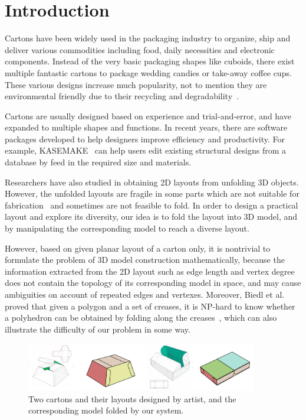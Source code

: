 \section{Introduction}

Cartons have been widely used in the packaging industry to organize, ship and deliver various commodities including food, daily necessities and electronic components. Instead of the very basic packaging shapes like cuboids, there exist multiple fantastic cartons to package wedding candies or take-away coffee cups. 
These various designs increase much popularity, not to mention they are environmental friendly due to their recycling and degradability~\cite{Mullineux:2010:CSC:1739328.1739673}.

Cartons are usually designed based on experience and trial-and-error, and have expanded to multiple shapes and functions. In recent years, there are software packages developed to help designers improve efficiency and productivity.
For example, KASEMAKE~\cite{KASEMAKE} can help users edit existing structural designs from a database by feed in the required size and materials.

Researchers have also studied in obtaining 2D layouts from unfolding 3D objects. However, the unfolded layouts are fragile in some parts which are not suitable for fabrication~\cite{Tai2004Unfolding} and sometimes are not feasible to fold.
In order to design a practical layout and explore its diversity, our idea is to fold the layout into 3D model, and by manipulating the corresponding model to reach a diverse layout.

However, based on given planar layout of a carton only, it is nontrivial to formulate the problem of 3D model construction mathematically, because the information extracted from the 2D layout such as edge length and vertex degree does not contain the topology of its corresponding model in space, and may cause ambiguities on account of repeated edges and vertexes. Moreover, Biedl et al. proved that given a polygon and a set of creases, it is NP-hard to know whether a polyhedron can be obtained by folding along the creases~\cite{Biedl:2005:NFP:1090462.1646553}, which can also illustrate the difficulty of our problem in some way.

\begin{figure}
	\centering
	\includegraphics[width=0.9\textwidth]{images/artist}
	\caption{Two cartons and their layouts designed by artist, and the corresponding model folded by our system.}
	\label{fig:artist}
\end{figure}

